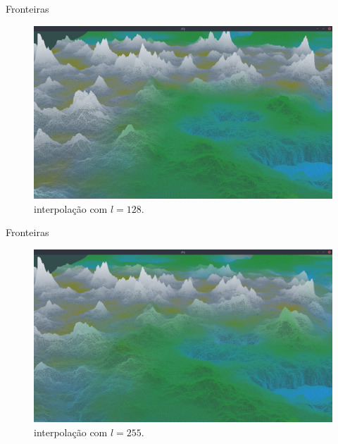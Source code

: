 \begin{frame}{Fronteiras}
    \begin{figure}[H]
        \centering
        \includegraphics[width=.9\textwidth]{img/borders/128lm.png}
        \caption{interpolação com $l = 128$.}
        \label{fig:img_borders_128lm}
    \end{figure}
    
\end{frame}

\begin{frame}{Fronteiras}
    \begin{figure}[H]
        \centering
        \includegraphics[width=.9\textwidth]{img/borders/255lm.png}
        \caption{interpolação com $l = 255$.}
        \label{fig:img_borders_255lm}
    \end{figure}
    
\end{frame}